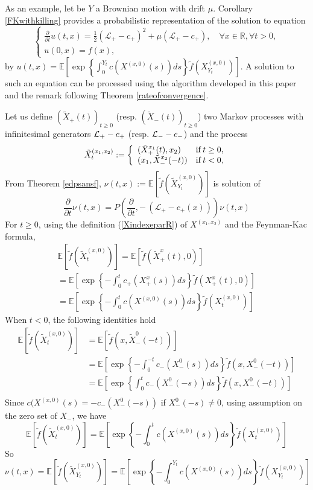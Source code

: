 \documentclass[a4paper, 11pt]{article}
\newcommand{\R}{\mathbb{R}}
\newcommand{\E}{\mathbb{E}}
\newcommand{\1}{\mathbf{1}}
\begin{document}
\medskip

\noindent As an example, let be $Y$ a Brownian motion with drift $\mu$. Corollary \ref{FKwithkilling} provides a probabilistic representation of the solution to equation
$$
\left \lbrace 
\begin{array}{lcl} 
\frac{\partial}{\partial t}u(t,x)=\frac{1}{2}\left(\mathcal{L}_+-c_+\right)^2+\mu \left(\mathcal{L}_+-c_+\right), \quad \forall x\in \R,\forall t>0,\\
u(0,x)=f(x),
\end{array}\right.
$$
by $u(t,x)=\E \left[ \exp \left\{ \int_0^{Y_t} c(X^{(x,0)}(s))ds\right\}\tilde{f}(X^{(x,0)}_{Y_t})\right]$. A solution to such an equation can be processed using the algorithm developed in this paper and the remark following Theorem \ref{rateofconvergence}.


\bigskip

 Let us define $(\tilde{X}_+(t))_{t\geq 0}$ (resp. $(\tilde{X}_-(t))_{t\geq 0}$) two Markov processes with infinitesimal generators ${\cal L}_+-c_+$ (resp. ${\cal L}_--c_-$) and the process
\begin{equation}
\tilde{X}^{(x_1,x_2)}_t:=\left\lbrace
\begin{array}{lcl} 
(\tilde{X}_+^{x_1}(t),x_2)& {\rm if} \, t\geq 0,\\ 
(x_1,\tilde{X}_-^{x_2}(-t))& {\rm if} \, t<0,
\end{array}\right.
\end{equation}
From Theorem \ref{edpsansf}, $\nu(t,x):=\E\left[\tilde{f}(\tilde{X}^{(x,0)}_{Y_t})\right]$ is solution of 
$$\frac{\partial}{\partial t}\nu(t,x)=P(\frac{\partial}{ \partial t},-\, (\mathcal{L}_+-c_+(x)))\nu(t,x)$$
For $t\geq 0$, using the definition (\ref{XindexeparR}) of $X^{(x_1,x_2)}$ and the Feynman-Kac formula,
\begin{multline*}
\E\left[\tilde{f}(\tilde{X}^{(x,0)}_t)\right]=\E\left[\tilde{f}(\tilde{X}_+^x(t),0)\right]\\=\E \left[\exp\left\{-\int_0^tc_+(X_+^x(s))ds\right\}\tilde{f}(X_+^x(t),0)\right]\\
=\E \left[\exp\left\{-\int_0^tc(X^{(x,0)}(s))ds\right\}\tilde{f}(X^{(x,0)}_t)\right]\
\end{multline*}
When $t<0$, the following identities hold
\begin{align*}
\E\left[\tilde{f}(\tilde{X}^{(x,0)}_t)\right]&=\E\left[\tilde{f}(x,\tilde{X}_-^0(-t))\right]\\
&=\E \left[\exp\left\{-\int_0^{-t}c_-(X_-^0(s))ds\right\}\tilde{f}(x,X_-^0(-t))\right]\\
&=\E \left[\exp\left\{\int_0^t c_-(X_-^0(-s))ds\right\}\tilde{f}(x,X_-^0(-t))\right]\\
\end{align*}
Since $c(X^{(x,0)}(s)=-c_-(X_-^0(-s))$ if $X_-^0(-s)\neq 0$, using assumption on the zero set of $X_-$, we have
$$\E\left[\tilde{f}(\tilde{X}^{(x,0)}_t)\right]=\E \left[\exp\left\{-\int_0^tc(X^{(x,0)}(s))ds\right\}\tilde{f}(X^{(x,0)}_t)\right]$$
So 
$$\nu(t,x)=\E\left[\tilde{f}(\tilde{X}^{(x,0)}_{Y_t})\right]=\E \left[\exp\left\{-\int_0^{Y_t}c(X^{(x,0)}(s))ds\right\}\tilde{f}(X^{(x,0)}_{Y_t})\right]$$
\hfill \framebox[0.6em]{}
\end{document}
